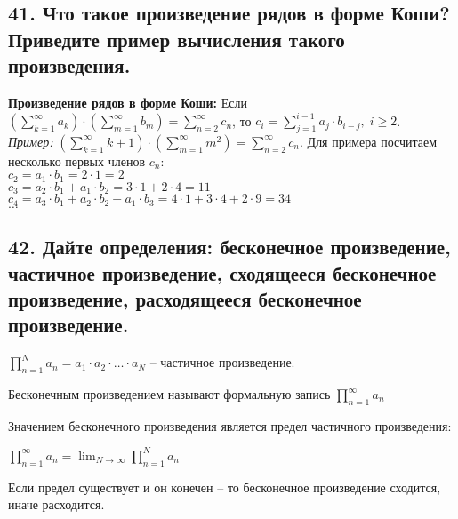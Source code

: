 \documentclass[a4paper, fleqn]{article}
\begin{document}
    \subsection*{41. Что такое произведение рядов в форме Коши? Приведите пример вычисления такого произведения.}
    \textbf{Произведение рядов в форме Коши:} Если $\left(\sum_{k=1}^{\infty} a_k\right) \cdot \left(\sum_{m=1}^{\infty} b_m \right) = \sum_{n=2}^{\infty} c_n$, то $c_i = \sum\limits_{j = 1}^{i - 1} a_j \cdot b_{i - j}, \; i \geq 2$. \\
    \textit{Пример:} $\left(\sum\limits_{k=1}^{\infty} k + 1 \right) \cdot \left( \sum\limits_{m = 1}^{\infty} m^2 \right) = \sum\limits_{n = 2}^{\infty} c_n$. Для примера посчитаем несколько первых членов $c_n$: \\
    $c_2 = a_1 \cdot b_1 = 2 \cdot 1 = 2$\\
    $c_3 = a_2 \cdot b_1 + a_1 \cdot b_2 = 3 \cdot 1 + 2 \cdot 4 = 11$ \\
    $c_4 = a_3 \cdot b_1 + a_2 \cdot b_2 + a_1 \cdot b_3 = 4 \cdot 1 + 3 \cdot 4 + 2 \cdot 9 = 34$ \\
    $\dots$ \\

        
        \subsection*{42. Дайте определения: бесконечное произведение, частичное произведение, сходящееся бесконечное произведение, расходящееся бесконечное произведение.}
 
        $\prod_{n=1}^{N} a_n = a_1 \cdot a_2 \cdot \dots \cdot a_N$ -- частичное произведение.

        Бесконечным произведением называют формальную запись $\prod_{n=1}^{\infty} a_n$

        Значением бесконечного произведения является предел частичного произведения:

        $\prod_{n=1}^{\infty} a_n = \lim_{N \to \infty} \prod_{n=1}^{N} a_n$

        Если предел существует и он конечен -- то бесконечное произведение сходится, иначе расходится.
        
\end{document}

